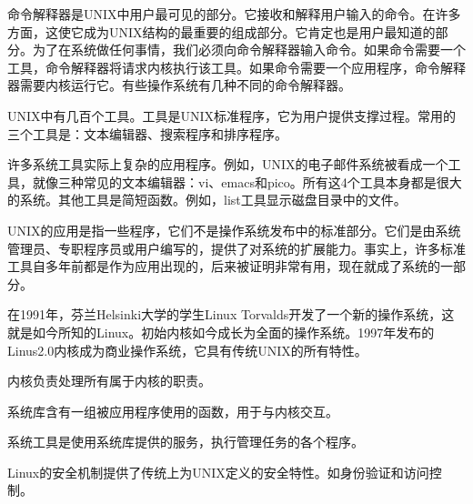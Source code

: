 命令解释器是UNIX中用户最可见的部分。它接收和解释用户输入的命令。在许多方面，这使它成为UNIX结构的最重要的组成部分。它肯定也是用户最知道的部分。为了在系统做任何事情，我们必须向命令解释器输入命令。如果命令需要一个工具，命令解释器将请求内核执行该工具。如果命令需要一个应用程序，命令解释器需要内核运行它。有些操作系统有几种不同的命令解释器。

UNIX中有几百个工具。工具是UNIX标准程序，它为用户提供支撑过程。常用的三个工具是：文本编辑器、搜索程序和排序程序。

许多系统工具实际上复杂的应用程序。例如，UNIX的电子邮件系统被看成一个工具，就像三种常见的文本编辑器：vi、emacs和pico。所有这4个工具本身都是很大的系统。其他工具是简短函数。例如，list工具显示磁盘目录中的文件。

UNIX的应用是指一些程序，它们不是操作系统发布中的标准部分。它们是由系统管理员、专职程序员或用户编写的，提供了对系统的扩展能力。事实上，许多标准工具自多年前都是作为应用出现的，后来被证明非常有用，现在就成了系统的一部分。

在1991年，芬兰Helsinki大学的学生Linux Torvalds开发了一个新的操作系统，这就是如今所知的Linux。初始内核如今成长为全面的操作系统。1997年发布的Linus2.0内核成为商业操作系统，它具有传统UNIX的所有特性。

内核负责处理所有属于内核的职责。

系统库含有一组被应用程序使用的函数，用于与内核交互。

系统工具是使用系统库提供的服务，执行管理任务的各个程序。

Linux的安全机制提供了传统上为UNIX定义的安全特性。如身份验证和访问控制。
